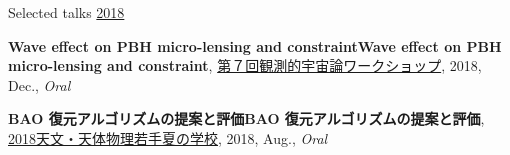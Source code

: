 \begin{rSection}{Selected talks}
\underline{2018}
\begin{etaremune}
\setcounter{enumi}{3}
\item \textbf{Wave effect on PBH micro-lensing and constraintWave effect on PBH micro-lensing and constraint}, \href{http://web.cc.yamaguchi-u.ac.jp/~rsaito/obscosmo2018/}{第７回観測的宇宙論ワークショップ}, 2018, Dec., \textit{Oral}
\item \textbf{BAO 復元アルゴリズムの提案と評価BAO 復元アルゴリズムの提案と評価}, \href{http://www.astro-wakate.org/ss2018/web/link.html}{2018天文・天体物理若手夏の学校}, 2018, Aug., \textit{Oral}
\end{etaremune}\end{rSection}

